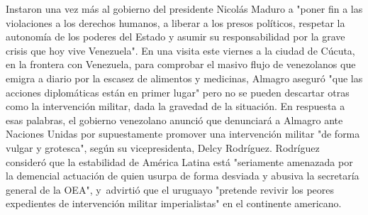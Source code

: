 \documentclass{article}%
\begin{document}
\newline%
%
Instaron una vez más al gobierno del presidente Nicolás Maduro a "poner fin a las violaciones a los derechos humanos, a liberar a los presos políticos, respetar la autonomía de los poderes del Estado y asumir su responsabilidad por la grave crisis que hoy vive Venezuela".%
\newline%
%
En una visita este viernes a la ciudad de Cúcuta, en la frontera con Venezuela, para comprobar el masivo flujo de venezolanos que emigra a diario por la escasez de alimentos y medicinas, Almagro aseguró "que las acciones diplomáticas están en primer lugar" pero no se pueden descartar otras como la intervención militar, dada la gravedad de la situación.%
\newline%
%
En respuesta a esas palabras, el gobierno venezolano anunció que denunciará a Almagro ante Naciones Unidas por supuestamente promover una intervención militar "de forma vulgar y grotesca", según su vicepresidenta, Delcy Rodríguez.%
\newline%
%
Rodríguez consideró que la estabilidad de América Latina está "seriamente amenazada por la demencial actuación de quien usurpa de forma desviada y abusiva la secretaría general de la OEA", y~advirtió que el uruguayo "pretende revivir los peores expedientes de intervención militar imperialistas" en el continente americano.%
\newline%
%
\end{document}
